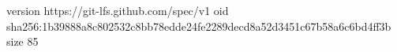 version https://git-lfs.github.com/spec/v1
oid sha256:1b39888a8c802532c8bb78edde24fe2289decd8a52d3451c67b58a6c6bd4ff3b
size 85
